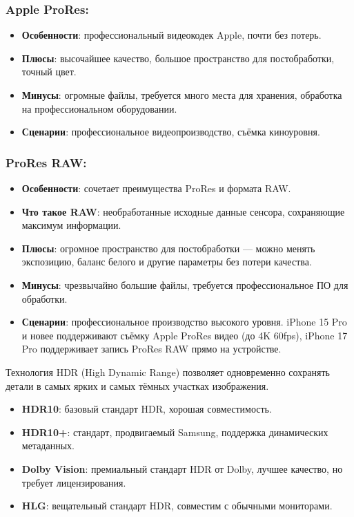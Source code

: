 \subsubsection*{Apple ProRes:}

\begin{itemize}
  \item \textbf{Особенности}: профессиональный видеокодек Apple, почти без потерь.
  \item \textbf{Плюсы}: высочайшее качество, большое пространство для постобработки, точный цвет.
  \item \textbf{Минусы}: огромные файлы, требуется много места для хранения, обработка на профессиональном оборудовании.
  \item \textbf{Сценарии}: профессиональное видеопроизводство, съёмка киноуровня.
\end{itemize}

\subsubsection*{ProRes RAW:}

\begin{itemize}
  \item \textbf{Особенности}: сочетает преимущества ProRes и формата RAW.
  \item \textbf{Что такое RAW}: необработанные исходные данные сенсора, сохраняющие максимум информации.
  \item \textbf{Плюсы}: огромное пространство для постобработки — можно менять экспозицию, баланс белого и другие параметры без потери качества.
  \item \textbf{Минусы}: чрезвычайно большие файлы, требуется профессиональное ПО для обработки.
  \item \textbf{Сценарии}: профессиональное производство высокого уровня. iPhone 15 Pro и новее поддерживают съёмку Apple ProRes видео (до 4K 60fps), iPhone 17 Pro поддерживает запись ProRes RAW прямо на устройстве.
\end{itemize}


Технология HDR (High Dynamic Range) позволяет одновременно сохранять детали в самых ярких и самых тёмных участках изображения.

\begin{itemize}
  \item \textbf{HDR10}: базовый стандарт HDR, хорошая совместимость.
  \item \textbf{HDR10+}: стандарт, продвигаемый Samsung, поддержка динамических метаданных.
  \item \textbf{Dolby Vision}: премиальный стандарт HDR от Dolby, лучшее качество, но требует лицензирования.
  \item \textbf{HLG}: вещательный стандарт HDR, совместим с обычными мониторами.
\end{itemize}

